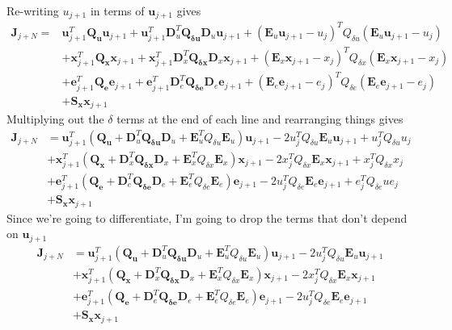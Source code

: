 \documentclass[landscape]{article}
\begin{document}
Re-writing $u_{j+1}$ in terms of $\mathbf{u}_{j+1}$ gives
\begin{equation}
\begin{split}
\mathbf{J}_{j+N} = 
& \mathbf{u}_{j+1}^T \mathbf{Q_u} \mathbf{u}_{j+1} + \mathbf{u}_{j+1}^T \mathbf{D}_u^T \mathbf{Q_{\delta u}} \mathbf{D}_u \mathbf{u}_{j+1} 
+ \left(\mathbf{E}_u\mathbf{u}_{j+1}-u_j\right)^T Q_{\delta u} \left(\mathbf{E}_u\mathbf{u}_{j+1}-u_j\right)\\
&+\mathbf{x}_{j+1}^T \mathbf{Q_x} \mathbf{x}_{j+1} + \mathbf{x}_{j+1}^T \mathbf{D}_x^T \mathbf{Q_{\delta x}} \mathbf{D}_x \mathbf{x}_{j+1} 
+ \left(\mathbf{E}_x\mathbf{x}_{j+1}-x_j\right)^T Q_{\delta x} \left(\mathbf{E}_x\mathbf{x}_{j+1}-x_j\right)\\
&+\mathbf{e}_{j+1}^T \mathbf{Q_e} \mathbf{e}_{j+1} + \mathbf{e}_{j+1}^T \mathbf{D}_e^T \mathbf{Q_{\delta e}} \mathbf{D}_e \mathbf{e}_{j+1} 
+ \left(\mathbf{E}_e\mathbf{e}_{j+1}-e_j\right)^T Q_{\delta e} \left(\mathbf{E}_e\mathbf{e}_{j+1}-e_j\right)\\
&+\mathbf{S_x}\mathbf{x}_{j+1}
\end{split}
\end{equation}
Multiplying out the $\delta$ terms at the end of each line and rearranging things gives
\begin{align}
\mathbf{J}_{j+N} 
& = \mathbf{u}_{j+1}^T \left(\mathbf{Q_u} + \mathbf{D}_u^T\mathbf{Q_{\delta u}} \mathbf{D}_u + \mathbf{E}_u^T Q_{\delta u} \mathbf{E}_u \right) \mathbf{u}_{j+1} - 2u_j^T Q_{\delta u} \mathbf{E}_u \mathbf{u}_{j+1} + u_j^T Q_{\delta u} u_j\\
& + \mathbf{x}_{j+1}^T \left(\mathbf{Q_x} + \mathbf{D}_x^T\mathbf{Q_{\delta x}} \mathbf{D}_x + \mathbf{E}_x^T Q_{\delta x} \mathbf{E}_x \right) \mathbf{x}_{j+1} - 2x_j^T Q_{\delta x} \mathbf{E}_x \mathbf{x}_{j+1} + x_j^T Q_{\delta x} x_j\\
& + \mathbf{e}_{j+1}^T \left(\mathbf{Q_e} + \mathbf{D}_e^T\mathbf{Q_{\delta e}} \mathbf{D}_e + \mathbf{E}_e^T Q_{\delta e} \mathbf{E}_e \right) \mathbf{e}_{j+1} - 2u_j^T Q_{\delta e} \mathbf{E}_e \mathbf{e}_{j+1} + e_j^T Q_{\delta e} u e_j\\
& + \mathbf{S_x}\mathbf{x}_{j+1}
\end{align}
Since we're going to differentiate, I'm going to drop the terms that don't depend on $\mathbf{u}_{j+1}$
\begin{align}
\mathbf{J}_{j+N} 
& = \mathbf{u}_{j+1}^T \left(\mathbf{Q_u} + \mathbf{D}_u^T\mathbf{Q_{\delta u}} \mathbf{D}_u + \mathbf{E}_u^T Q_{\delta u} \mathbf{E}_u \right) \mathbf{u}_{j+1} - 2u_j^T Q_{\delta u} \mathbf{E}_u \mathbf{u}_{j+1} \\
& + \mathbf{x}_{j+1}^T \left(\mathbf{Q_x} + \mathbf{D}_x^T\mathbf{Q_{\delta x}} \mathbf{D}_x + \mathbf{E}_x^T Q_{\delta x} \mathbf{E}_x \right) \mathbf{x}_{j+1} - 2x_j^T Q_{\delta x} \mathbf{E}_x \mathbf{x}_{j+1} \\
& + \mathbf{e}_{j+1}^T \left(\mathbf{Q_e} + \mathbf{D}_e^T\mathbf{Q_{\delta e}} \mathbf{D}_e + \mathbf{E}_e^T Q_{\delta e} \mathbf{E}_e \right) \mathbf{e}_{j+1} - 2u_j^T Q_{\delta e} \mathbf{E}_e \mathbf{e}_{j+1} \\
& + \mathbf{S_x}\mathbf{x}_{j+1}
\end{align}
\end{document}
